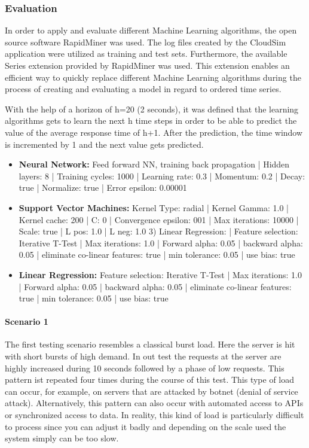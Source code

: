 \subsubsection{Evaluation}\label{MLeval}
In order to apply and evaluate different Machine Learning algorithms, the open source software RapidMiner \cite{rapidminer} was used. The log files created by the CloudSim application were utilized as training and test sets. Furthermore, the available Series extension provided by RapidMiner was used. This extension enables an efficient way to quickly replace different Machine Learning algorithms during the process of creating and evaluating a model in regard to ordered time series.

With the help of a horizon of h=20 (2 seconds), it was defined that the learning algorithms gets to learn the next h time steps in order to be able to predict the value of the average response time of h+1. After the prediction, the time window is incremented by 1 and the next value gets predicted. 

\begin{itemize}
\item \textbf{Neural Network:} Feed forward NN, training back propagation | Hidden layers: 8 | Training cycles: 1000 | Learning rate: 0.3 | Momentum: 0.2 | Decay: true | Normalize: true | Error epsilon: 0.00001
\item \textbf{Support Vector Machines:} Kernel Type: radial | Kernel Gamma: 1.0 | Kernel cache: 200 | C: 0 | Convergence epsilon: 001 | Max iterations: 10000 | Scale: true | L pos: 1.0 | L neg: 1.0 3) Linear Regression: | Feature selection: Iterative T-Test | Max iterations: 1.0 | Forward alpha: 0.05 | backward alpha: 0.05 | eliminate co-linear features: true | min tolerance: 0.05 | use bias: true 
\item \textbf{Linear Regression:} Feature selection: Iterative T-Test | Max iterations: 1.0 | Forward alpha: 0.05 | backward alpha: 0.05 | eliminate co-linear features: true | min tolerance: 0.05 | use bias: true 
\end{itemize}


\paragraph*{Scenario 1}
The first testing scenario resembles a classical burst load. Here the server is hit with short bursts of high demand. In out test the requests at the server are highly increased during 10 seconds followed by a phase of low requests. This pattern ist repeated four times during the course of this test. This type of load can occur, for example, on servers that are attacked by botnet (denial of service attack). Alternatively, this pattern can also occur with automated access to APIs or synchronized access to data. In reality, this kind of load is particularly difficult to process since you can adjust it badly and depending on the scale used the system simply can be too slow.



